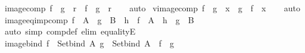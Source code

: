 \begin{isabellebody}
\ image{\isacharunderscore}{\kern0pt}comp{\isacharcolon}{\kern0pt}\ {\isachardoublequoteopen}f\ {\isacharbackquote}{\kern0pt}\ {\isacharparenleft}{\kern0pt}g\ {\isacharbackquote}{\kern0pt}\ r{\isacharparenright}{\kern0pt}\ {\isacharequal}{\kern0pt}\ {\isacharparenleft}{\kern0pt}f\ {\isasymcirc}\ g{\isacharparenright}{\kern0pt}\ {\isacharbackquote}{\kern0pt}\ r{\isachardoublequoteclose}\isanewline
%
\isadelimproof
\ \ %
\endisadelimproof
%
\isatagproof
{}\isamarkupfalse%
\ auto%
\endisatagproof
{\isafoldproof}%
%
\isadelimproof
\isanewline
%
\endisadelimproof
\isanewline
{}\isamarkupfalse%
\ vimage{\isacharunderscore}{\kern0pt}comp{\isacharcolon}{\kern0pt}\ {\isachardoublequoteopen}f\ {\isacharminus}{\kern0pt}{\isacharbackquote}{\kern0pt}\ {\isacharparenleft}{\kern0pt}g\ {\isacharminus}{\kern0pt}{\isacharbackquote}{\kern0pt}\ x{\isacharparenright}{\kern0pt}\ {\isacharequal}{\kern0pt}\ {\isacharparenleft}{\kern0pt}g\ {\isasymcirc}\ f{\isacharparenright}{\kern0pt}\ {\isacharminus}{\kern0pt}{\isacharbackquote}{\kern0pt}\ x{\isachardoublequoteclose}\isanewline
%
\isadelimproof
\ \ %
\endisadelimproof
%
\isatagproof
{}\isamarkupfalse%
\ auto%
\endisatagproof
{\isafoldproof}%
%
\isadelimproof
\isanewline
%
\endisadelimproof
\isanewline
{}\isamarkupfalse%
\ image{\isacharunderscore}{\kern0pt}eq{\isacharunderscore}{\kern0pt}imp{\isacharunderscore}{\kern0pt}comp{\isacharcolon}{\kern0pt}\ {\isachardoublequoteopen}f\ {\isacharbackquote}{\kern0pt}\ A\ {\isacharequal}{\kern0pt}\ g\ {\isacharbackquote}{\kern0pt}\ B\ {\isasymLongrightarrow}\ {\isacharparenleft}{\kern0pt}h\ {\isasymcirc}\ f{\isacharparenright}{\kern0pt}\ {\isacharbackquote}{\kern0pt}\ A\ {\isacharequal}{\kern0pt}\ {\isacharparenleft}{\kern0pt}h\ {\isasymcirc}\ g{\isacharparenright}{\kern0pt}\ {\isacharbackquote}{\kern0pt}\ B{\isachardoublequoteclose}\isanewline
%
\isadelimproof
\ \ %
\endisadelimproof
%
\isatagproof
{}\isamarkupfalse%
\ {\isacharparenleft}{\kern0pt}auto\ simp{\isacharcolon}{\kern0pt}\ comp{\isacharunderscore}{\kern0pt}def\ elim{\isacharbang}{\kern0pt}{\isacharcolon}{\kern0pt}\ equalityE{\isacharparenright}{\kern0pt}%
\endisatagproof
{\isafoldproof}%
%
\isadelimproof
\isanewline
%
\endisadelimproof
\isanewline
{}\isamarkupfalse%
\ image{\isacharunderscore}{\kern0pt}bind{\isacharcolon}{\kern0pt}\ {\isachardoublequoteopen}f\ {\isacharbackquote}{\kern0pt}\ {\isacharparenleft}{\kern0pt}Set{\isachardot}{\kern0pt}bind\ A\ g{\isacharparenright}{\kern0pt}\ {\isacharequal}{\kern0pt}\ Set{\isachardot}{\kern0pt}bind\ A\ {\isacharparenleft}{\kern0pt}{\isacharparenleft}{\kern0pt}{\isacharbackquote}{\kern0pt}{\isacharparenright}{\kern0pt}\ f\ {\isasymcirc}\ g{\isacharparenright}{\kern0pt}{\isachardoublequoteclose}\isanewline

\end{isabellebody}
